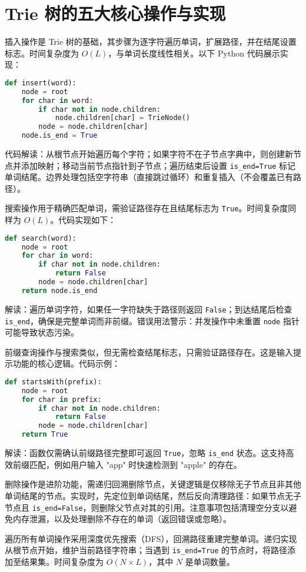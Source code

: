 \chapter{Trie 树的五大核心操作与实现}
插入操作是 Trie 树的基础，其步骤为逐字符遍历单词，扩展路径，并在结尾设置标志。时间复杂度为 $O(L)$，与单词长度线性相关。以下 Python 代码展示实现：\par
\begin{lstlisting}[language=python]
def insert(word):
    node = root
    for char in word:
        if char not in node.children:
            node.children[char] = TrieNode()
        node = node.children[char]
    node.is_end = True
\end{lstlisting}
代码解读：从根节点开始遍历每个字符；如果字符不在子节点字典中，则创建新节点并添加映射；移动当前节点指针到子节点；遍历结束后设置 \texttt{is\_{}end=True} 标记单词结尾。边界处理包括空字符串（直接跳过循环）和重复插入（不会覆盖已有路径）。\par
搜索操作用于精确匹配单词，需验证路径存在且结尾标志为 \texttt{True}。时间复杂度同样为 $O(L)$。代码实现如下：\par
\begin{lstlisting}[language=python]
def search(word):
    node = root
    for char in word:
        if char not in node.children:
            return False
        node = node.children[char]
    return node.is_end
\end{lstlisting}
解读：遍历单词字符，如果任一字符缺失于路径则返回 \texttt{False}；到达结尾后检查 \texttt{is\_{}end}，确保是完整单词而非前缀。错误用法警示：并发操作中未重置 \texttt{node} 指针可能导致状态污染。\par
前缀查询操作与搜索类似，但无需检查结尾标志，只需验证路径存在。这是输入提示功能的核心逻辑。代码示例：\par
\begin{lstlisting}[language=python]
def startsWith(prefix):
    node = root
    for char in prefix:
        if char not in node.children:
            return False
        node = node.children[char]
    return True
\end{lstlisting}
解读：函数仅需确认前缀路径完整即可返回 \texttt{True}，忽略 \texttt{is\_{}end} 状态。这支持高效前缀匹配，例如用户输入 "app" 时快速检测到 "apple" 的存在。\par
删除操作是进阶功能，需递归回溯删除节点，关键逻辑是仅移除无子节点且非其他单词结尾的节点。实现时，先定位到单词结尾，然后反向清理路径：如果节点无子节点且 \texttt{is\_{}end=False}，则删除父节点对其的引用。注意事项包括清理空分支以避免内存泄漏，以及处理删除不存在的单词（返回错误或忽略）。\par
遍历所有单词操作采用深度优先搜索（DFS），回溯路径重建完整单词。递归实现从根节点开始，维护当前路径字符串；当遇到 \texttt{is\_{}end=True} 的节点时，将路径添加至结果集。时间复杂度为 $O(N \times L)$，其中 $N$ 是单词数量。\par
